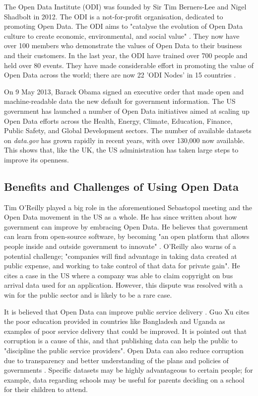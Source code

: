 \documentclass[authoryearcitations]{UoYCSproject}
\begin{document}
The Open Data Institute (ODI) was founded by Sir Tim Berners-Lee and Nigel Shadbolt in 2012. The ODI is a not-for-profit organisation, dedicated to promoting Open Data. The ODI aims to "catalyse the evolution of Open Data culture to create economic, environmental, and social value" \citep{TheOpenDataInstitute}. They now have over 100 members who demonstrate the values of Open Data to their business and their customers. In the last year, the ODI have trained over 700 people and held over 80 events. They have made considerable effort in promoting the value of Open Data across the world; there are now 22 'ODI Nodes' in 15 countries \citep{TheOpenDataInstitute2015a}.

On 9 May 2013, Barack Obama signed an executive order \citep{TheWhiteHouse-OfficeofthePressSecretary2013} that made open and machine-readable data the new default for government information. The US government has launched a number of Open Data initiatives aimed at scaling up Open Data efforts across the Health, Energy, Climate, Education, Finance, Public Safety, and Global Development sectors. The number of available datasets on \textit{data.gov} has grown rapidly in recent years, with over 130,000 now available. This shows that, like the UK, the US administration has taken large steps to improve its openness.

\subsection{Benefits and Challenges of Using Open Data}

Tim O'Reilly played a big role in the aforementioned Sebastopol meeting and the Open Data movement in the US as a whole. He has since written about how government can improve by embracing Open Data.  He believes that government can learn from open-source software, by becoming "an open platform that allows people inside and outside government to innovate" \citep{OReilly2011}. O'Reilly also warns of a potential challenge; "companies will find advantage in taking data created at public expense, and working to take control of that data for private gain". He cites a case in the US where a company was able to claim copyright on bus arrival data used for an application. However, this dispute was resolved with a win for the public sector and is likely to be a rare case.

It is believed that Open Data can improve public service delivery \citep{Xu2012}. Guo Xu cites the poor education provided in countries like Bangladesh and Uganda as examples of poor service delivery that could be improved. It is pointed out that corruption is a cause of this, and that publishing data can help the public to "discipline the public service providers". Open Data can also reduce corruption due to transparency and better understanding of the plans and policies of governments \citep{Vathana}. Specific datasets may be highly advantageous to certain people; for example, data regarding schools may be useful for parents deciding on a school for their children to attend. 
\end{document}
